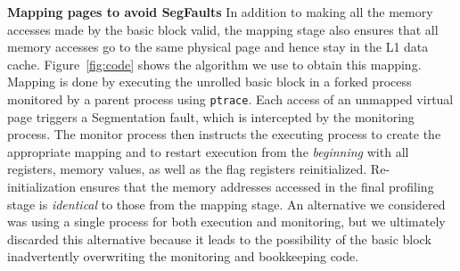 \textbf{Mapping pages to avoid SegFaults}
In addition to making all the memory accesses made by the basic block valid,
the mapping stage also ensures that all memory accesses go to the same physical page and hence stay in the L1 data cache. 
Figure~\ref{fig:code} shows the algorithm we use to obtain this mapping.
Mapping is done by executing the unrolled basic block in a forked process
 monitored by a parent process using \verb|ptrace|.
Each access of an unmapped virtual page triggers a Segmentation fault, which is intercepted by
the monitoring process. The monitor process then instructs the 
executing process to create the appropriate mapping
and to restart execution from the \textit{beginning}
with all registers, memory values,
as well as the flag registers reinitialized.
Re-initialization ensures that the memory addresses accessed in the final profiling
stage is \textit{identical} to those from the mapping stage.
An alternative we considered was using a single process for both execution
and monitoring, but we ultimately discarded this alternative because
it leads to the possibility of the basic block inadvertently overwriting
the monitoring and bookkeeping code.



%    
%    
%    
%    
%    

